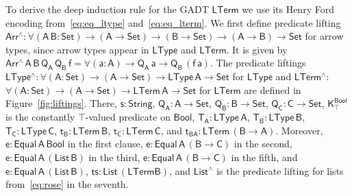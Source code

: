 \documentclass[9pt]{entcs}
\begin{document}
To derive the deep induction rule for the GADT $\mathsf{LTerm}$ we use
its Henry Ford encoding from~\eqref{eq:eq_ltype}
and~\eqref{eq:eq_lterm}. We first define predicate lifting
$\mathsf{Arr^{\wedge} : \forall (A\, B : Set) \to (A \to Set) \to (B
  \to Set) \to (A \to B) \to Set}$ for arrow types, since arrow types
appear in $\mathsf{LType}$ and $\mathsf{LTerm}$. It is given by
$\mathsf{Arr^{\wedge}\, A\, B\, Q_A\, Q_B\, f = \forall (a : A) \to
  Q_A\,a \to Q_B\, (f\,a)}$. The predicate liftings
$\mathsf{LType^{\wedge} : \forall (A : Set) \to (A \to Set) \to
  LType\,A \to Set}$ for $\mathsf{LType}$ and $\mathsf{LTerm^{\wedge}
  :}$ $\mathsf{\forall (A : Set) \to (A \to Set) \to LTerm\,A \to
  Set}$ for $\mathsf{LTerm}$ are defined in Figure~\ref{fig:liftings}.
There, $\mathsf{s : String}$, $\mathsf{Q_A : A \to Set}$, $\mathsf{Q_B
  : B \to Set}$, $\mathsf{Q_C : C \to Set}$,
$\mathsf{K^{Bool}_{\top}}$ is the constantly {\color{red}
  $\mathsf{\top}$}-valued predicate on $\mathsf{Bool}$, $\mathsf{T_A :
  LType\, A}$, $\mathsf{T_B : LType \,B}$, $\mathsf{T_C : LType \,C}$,
$\mathsf{t_B : LTerm \, B}$, $\mathsf{t_C : LTerm \, C}$, and
$\mathsf{t_{BA} : LTerm \, (B \to A)}$.  Moreover, $\mathsf{e :
  Equal\,A\,Bool}$ in the first clause, $\mathsf{e : Equal\, A\, (B
  \to C)}$ in the second, $\mathsf{e : Equal\, A\, (List\, B)}$ in the
third, $\mathsf{e : Equal \, A \, (B \to C)}$ in the fifth, and
$\mathsf{e : Equal\, A\, (List \,B)}$, $\mathsf{ts : List\, (LTerm
  B)}$, and $\mathsf{List^\wedge}$ is the predicate lifting for lists
from~\eqref{eq:rose} in the seventh.
\end{document}
